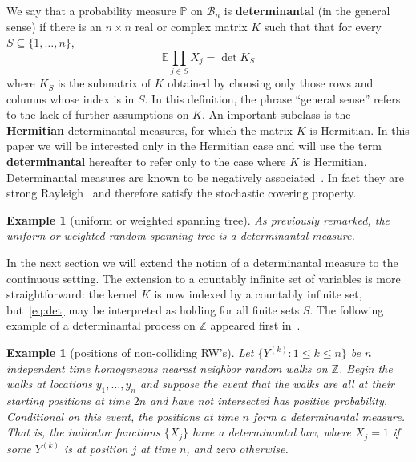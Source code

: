 \documentclass[10pt]{article}
\theoremstyle{plain}
\newtheorem{example}[thm]{Example}
\theoremstyle{remark}
\newcommand{\Em}[1]{\textbf{#1}}
\def\Z{\mathbb{Z}}
\def\E{{\mathbb E}}
\def\P{{\mathbb P}}
\def\B{{\mathcal B}}
\begin{document}
We say that a probability measure $\P$ on $\B_n$ is
\Em{determinantal} (in the general sense) if there is
an $n \times n$ real or complex matrix $K$ such that that
for every $S \subseteq \{ 1 , \ldots , n \}$,
\begin{equation} \label{eq:det}
\E \prod_{j \in S} X_j = \det K_S
\end{equation}
where $K_S$ is the submatrix of $K$ obtained by choosing only those
rows and columns whose index is in $S$.  In this definition, the
phrase ``general sense'' refers to the lack of further assumptions
on $K$.  An important subclass is the \Em{Hermitian} determinantal
measures, for which the matrix $K$ is Hermitian.  In this paper we
will be interested only in the Hermitian case and will use the term
\Em{determinantal} hereafter to refer only to the case where $K$ is
Hermitian.  Determinantal measures are known to be negatively
associated~\cite[Theorem~6.5]{lyons03}.  In fact they are strong
Rayleigh~\cite[proof of Theorem~3.4]{borcea-branden-liggett} and
therefore satisfy the stochastic covering property.
%
\begin{example}[uniform or weighted spanning tree]
\label{eg:spanning tree 2}
As previously remarked, the uniform or weighted random spanning
tree is a determinantal measure.
\end{example}

In the next section we will extend the notion of a determinantal
measure to the continuous setting.  The extension to a countably
infinite set of variables is more straightforward: the kernel $K$
is now indexed by a countably infinite set, but~\eqref{eq:det}
may be interpreted as holding for all finite sets $S$.  The following
example of a determinantal process on $\Z$ appeared first
in~\cite{johansson03}.

\begin{example}[positions of non-colliding RW's]
\label{eg:nonintersecting RW}
Let $\{ Y^{(k)} : 1 \leq k \leq n \}$ be $n$ independent time
homogeneous nearest neighbor random walks on $\Z$.  Begin the
walks at locations $y_1 , \ldots , y_n$ and suppose the
event that the walks are all at their starting positions at
time $2n$ and have not intersected has positive probability.
Conditional on this event, the positions at time $n$ form
a determinantal measure.  That is, the indicator functions
$\{ X_j \}$ have a determinantal law, where $X_j = 1$ if
some $Y^{(k)}$ is at position $j$ at time $n$, and zero otherwise.
\end{example}
\end{document}
